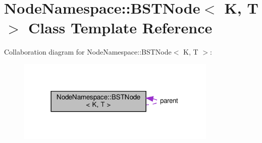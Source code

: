 \hypertarget{class_node_namespace_1_1_b_s_t_node}{}\section{Node\+Namespace\+:\+:B\+S\+T\+Node$<$ K, T $>$ Class Template Reference}
\label{class_node_namespace_1_1_b_s_t_node}


Collaboration diagram for Node\+Namespace\+:\+:B\+S\+T\+Node$<$ K, T $>$\+:\nopagebreak
\begin{figure}[H]
\begin{center}
\leavevmode
\includegraphics[width=270pt]{class_node_namespace_1_1_b_s_t_node__coll__graph}
\end{center}
\end{figure}
